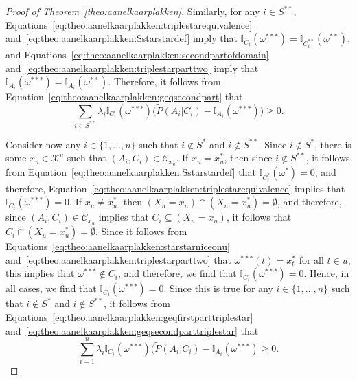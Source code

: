 \documentclass[10pt]{paper}
\theoremstyle{definition}
\newcommand{\states}{\mathcal{X}}
\newcommand{\ind}[1]{\mathbb{I}_{#1}}
\begin{document}
\begin{proof}[Proof of Theorem~\ref{theo:aanelkaarplakken}]
Similarly, for any $i\in S^{**}$, 
Equations~\eqref{eq:theo:aanelkaarplakken:triplestarequivalence} and~\eqref{eq:theo:aanelkaarplakken:Sstarstardef} imply that $\ind{C_i}(\omega^{***})=\ind{C_i^{**}}(\omega^{**})$,
and Equations~\eqref{eq:theo:aanelkaarplakken:secondpartofdomain} and~\eqref{eq:theo:aanelkaarplakken:triplestarparttwo} imply that $\ind{A_i}(\omega^{***})=\ind{A_i}(\omega^{**})$. Therefore, it follows from Equation~\eqref{eq:theo:aanelkaarplakken:geqsecondpart} that
\begin{equation}\label{eq:theo:aanelkaarplakken:geqsecondparttriplestar}
\sum_{i\in S^{**}}\lambda_i\ind{C_i}(\omega^{***})\bigl(\tilde{P}(A_i\vert C_i)-\ind{A_i}(\omega^{***})\bigr)
\geq0.
\end{equation}

Consider now any $i\in\{1,\dots,n\}$ such that $i\notin S^*$ and $i\notin S^{**}$. Since $i\notin S^*$, there is some $x_u\in\states^u$ such that $(A_i,C_i)\in\mathcal{C}_{x_u}$. If $x_u= x_u^*$, then since $i\notin S^{**}$, it follows from Equation~\eqref{eq:theo:aanelkaarplakken:Sstarstardef} that $\ind{C_i^*}(\omega^*)=0$, and therefore, Equation~\eqref{eq:theo:aanelkaarplakken:triplestarequivalence} implies that $\ind{C_i}(\omega^{***})=0$. 
If $x_u\neq x_u^*$, then $(X_u=x_u)\cap(X_u=x_u^*)=\emptyset$, and therefore, since $(A_i,C_i)\in\mathcal{C}_{x_u}$ implies that $C_i\subseteq (X_u=x_u)$, it follows that $C_i\cap (X_u=x_u^*)=\emptyset$. Since it follows from Equations~\eqref{eq:theo:aanelkaarplakken:starstarniceonu} and~\eqref{eq:theo:aanelkaarplakken:triplestarparttwo} that $\omega^{***}(t)=x_t^*$ for all $t\in u$, this implies that $\omega^{***}\notin C_i$, and therefore, we find that $\ind{C_i}(\omega^{***})=0$.
Hence, in all cases, we find that $\ind{C_i}(\omega^{***})=0$. Since this is true for any $i\in\{1,\dots,n\}$ such that $i\notin S^*$ and $i\notin S^{**}$, it follows from Equations~\eqref{eq:theo:aanelkaarplakken:geqfirstparttriplestar} and~\eqref{eq:theo:aanelkaarplakken:geqsecondparttriplestar} that
\begin{equation}\label{eq:theo:aanelkaarplakken:geqtotal}
\sum_{i=1}^n\lambda_i\ind{C_i}(\omega^{***})\bigl(\tilde{P}(A_i\vert C_i)-\ind{A_i}(\omega^{***})\geq0.
\end{equation}


\end{proof}
\end{document}
